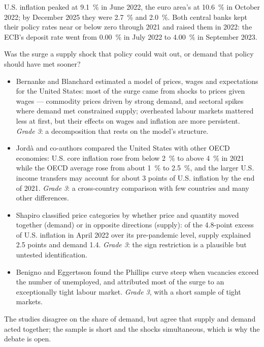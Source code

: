 U.S. inflation peaked at 9.1~\% in June 2022, the euro area's at 10.6~\% in October
2022; by December 2025 they were 2.7~\% and 2.0~\%. Both central banks kept their policy
rates near or below zero through 2021 and raised them in 2022: the ECB's deposit rate went
from 0.00~\% in July 2022 to 4.00~\% in September 2023. %

\begin{debate}
Was the surge a supply shock that policy could wait out, or demand that policy
should have met sooner?
\begin{itemize}
\item Bernanke and Blanchard estimated a model of prices, wages and expectations
for the United States: most of the surge came from shocks to prices given wages
--- commodity prices driven by strong demand, and sectoral spikes where demand
met constrained supply; overheated labour markets mattered less at first, but
their effects on wages and inflation are more persistent. %
\emph{Grade 3}: a decomposition that rests on the model's structure.
\item Jordà and co-authors compared the United States with other OECD economies:
U.S. core inflation rose from below 2~\% to above 4~\% in 2021 while the OECD average
rose from about 1~\% to 2.5~\%, and the larger U.S. income transfers may account for
about 3 points of U.S. inflation by the end of 2021. %
\emph{Grade 3}: a cross-country comparison with few countries and many other
differences.
\item Shapiro classified price categories by whether price and quantity moved
together (demand) or in opposite directions (supply): of the 4.8-point excess of
U.S. inflation in April 2022 over its pre-pandemic level, supply explained 2.5
points and demand 1.4. %
\emph{Grade 3}: the sign restriction is a plausible but untested identification.
\item Benigno and Eggertsson found the Phillips curve steep when vacancies exceed
the number of unemployed, and attributed most of the surge to an exceptionally
tight labour market. %
\emph{Grade 3}, with a short sample of tight markets.
\end{itemize}
The studies disagree on the share of demand, but agree that supply and demand
acted together; the sample is short and the shocks simultaneous, which is why
the debate is open.
\end{debate}

